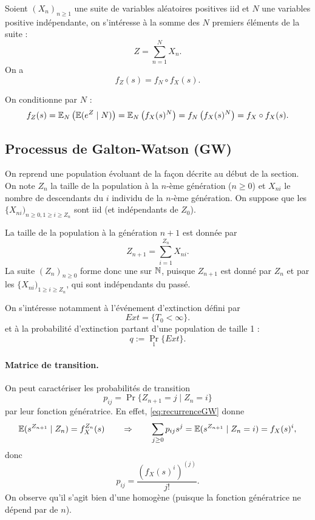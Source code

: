 \begin{proposition}
  Soient $(X_n)_{n \geq 1}$ une suite de variables aléatoires positives iid et $N$ une variables positive indépendante, on s'intéresse à la somme des $N$ premiers éléments de la suite :
  $$
  Z = \sum_{n=1}^N X_n.
  $$
  On a 
  $$
  f_{Z}(s) = f_N \circ f_X(s).
  $$
\end{proposition}

\proof
On conditionne par $N$ :
\begin{align*}
  f_Z(s) 
  = \operatorname{\mathbb{E}}_N \left(\operatorname{\mathbb{E}}(e^Z \mid N) \right)
  = \operatorname{\mathbb{E}}_N \left(f_X(s)^N \right)
  = f_N \left(f_X(s)^N \right) = f_X \circ f_X(s).
\end{align*}

\eproof

\subsection{Processus de Galton-Watson (GW)} 

On reprend une population évoluant de la façon décrite au début de la section. 
On note $Z_n$ la taille de la population à la $n$-ème génération ($n \geq 0$) et $X_{ni}$ le nombre de descendants du $i$ individu de la $n$-ème génération. 
On suppose que les $\{X_{ni})_{n \geq 0, 1 \geq i \geq Z_n}$ sont iid (et indépendants de $Z_0$).

\bigskip
La taille de la population à la génération $n+1$ est donnée par 
\begin{equation} \label{eq:recurrenceGW}
Z_{n+1} = \sum_{i = 1}^{Z_n} X_{ni}.
\end{equation}
La suite $(Z_n)_{n \geq 0}$ forme donc une \cM sur $\mathbb{N}$, puisque $Z_{n+1}$ est donné par $Z_n$ et par les $\{X_{ni})_{1 \geq i \geq Z_n}$, qui sont indépendants du passé.

\bigskip
On s'intéresse notamment à l'événement d'extinction défini par 
$$
Ext = \{T_0 < \infty\}.
$$
et à la probabilité d'extinction partant d'une population de taille 1 : 
$$
q := \Pr_1\{Ext\}.
$$


\paragraph*{Matrice de transition.} 
On peut caractériser les probabilités de transition 
$$
p_{ij} = \Pr\{Z_{n+1} = j \mid Z_n = i\}
$$
par leur fonction génératrice. En effet, \eqref{eq:recurrenceGW} donne
$$
\operatorname{\mathbb{E}}(s^{Z_{n+1}} \mid Z_n) = f_X^{Z_n}(s)
\qquad \Rightarrow \qquad 
\sum_{j \geq 0} p_{ij} s^j = \operatorname{\mathbb{E}}(s^{Z_{n+1}} \mid Z_n=i) = f_X(s)^i,
$$
donc
$$
p_{ij} = \frac{\left(f_X(s)^i\right)^{(j)}}{j!}.
$$
On observe qu'il s'agit bien d'une \cM homogène (puisque la fonction génératrice ne dépend par de $n$).

